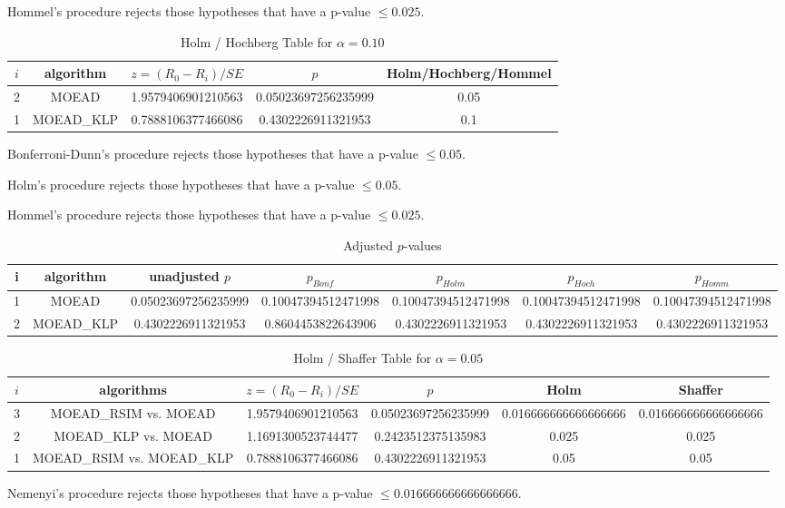 \documentclass[a4paper,10pt]{article}
\begin{document}
\begin{landscape}
Hommel's procedure rejects those hypotheses that have a p-value $\le0.025$.


\begin{table}[!htp]
\centering\tiny
\caption{Holm / Hochberg Table for $\alpha=0.10$}
\begin{tabular}{ccccc}
$i$&algorithm&$z=(R_0 - R_i)/SE$&$p$&Holm/Hochberg/Hommel\\
\hline
2&MOEAD&1.9579406901210563&0.05023697256235999&0.05\\
1&MOEAD_KLP&0.7888106377466086&0.4302226911321953&0.1\\
\hline
\end{tabular}
\end{table}
Bonferroni-Dunn's procedure rejects those hypotheses that have a p-value $\le0.05$.


Holm's procedure rejects those hypotheses that have a p-value $\le0.05$.


Hommel's procedure rejects those hypotheses that have a p-value $\le0.025$.


\begin{table}[!htp]
\centering\tiny
\caption{Adjusted $p$-values}
\begin{tabular}{ccccccc}
i&algorithm&unadjusted $p$&$p_{Bonf}$&$p_{Holm}$&$p_{Hoch}$&$p_{Homm}$\\
\hline
1&MOEAD&0.05023697256235999&0.10047394512471998&0.10047394512471998&0.10047394512471998&0.10047394512471998\\
2&MOEAD_KLP&0.4302226911321953&0.8604453822643906&0.4302226911321953&0.4302226911321953&0.4302226911321953\\
\hline
\end{tabular}
\end{table}

\begin{table}[!htp]
\centering\tiny
\caption{Holm / Shaffer Table for $\alpha=0.05$}
\begin{tabular}{cccccc}
$i$&algorithms&$z=(R_0 - R_i)/SE$&$p$&Holm&Shaffer\\
\hline
3&MOEAD_RSIM vs. MOEAD&1.9579406901210563&0.05023697256235999&0.016666666666666666&0.016666666666666666\\
2&MOEAD_KLP vs. MOEAD&1.1691300523744477&0.2423512375135983&0.025&0.025\\
1&MOEAD_RSIM vs. MOEAD_KLP&0.7888106377466086&0.4302226911321953&0.05&0.05\\
\hline
\end{tabular}
\end{table}
Nemenyi's procedure rejects those hypotheses that have a p-value $\le0.016666666666666666$.



\end{landscape}
\end{document}
